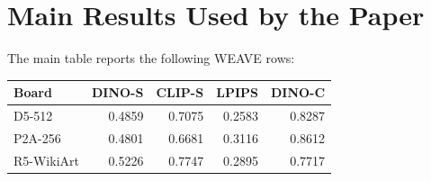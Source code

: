 \documentclass[10pt,twocolumn]{article}
\newcommand{\weave}{WEAVE}
\newcommand{\dinos}{DINO-S}
\newcommand{\dinoc}{DINO-C}
\newcommand{\clips}{CLIP-S}
\begin{document}
\section{Main Results Used by the Paper}

The main table reports the following \weave{} rows:

\begin{center}
\begin{tabular}{lrrrr}
\toprule
Board & \dinos{} & \clips{} & LPIPS & \dinoc{} \\
\midrule
D5-512 & 0.4859 & 0.7075 & 0.2583 & 0.8287 \\
P2A-256 & 0.4801 & 0.6681 & 0.3116 & 0.8612 \\
R5-WikiArt & 0.5226 & 0.7747 & 0.2895 & 0.7717 \\
\bottomrule
\end{tabular}
\end{center}
\end{document}
